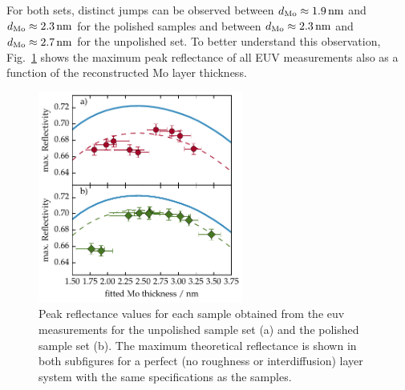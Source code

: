 For both sets, distinct jumps can be observed between $d_\text{Mo}\approx\nm{1.9}$ and $d_\text{Mo}\approx\nm{2.3}$ for the polished samples and between $d_\text{Mo}\approx\nm{2.3}$ and $d_\text{Mo}\approx\nm{2.7}$ for the unpolished set. To better understand this observation, Fig.~\ref{ch_spec:fig_EUV_peak_refl} shows the maximum peak reflectance of all EUV measurements also as a function of the reconstructed Mo layer thickness.
\begin{figure}[htbp]
\centering
\includegraphics[width=0.6\textwidth]{img/MoSi_EUV_peak}
\caption{Peak reflectance values for each sample obtained from the \gls{euv} measurements for the unpolished sample set (a) and the polished sample set (b). The maximum theoretical reflectance is shown in both subfigures for a perfect (no roughness or interdiffusion) layer system with the same specifications as the samples.}
\label{ch_spec:fig_EUV_peak_refl}
\end{figure}
